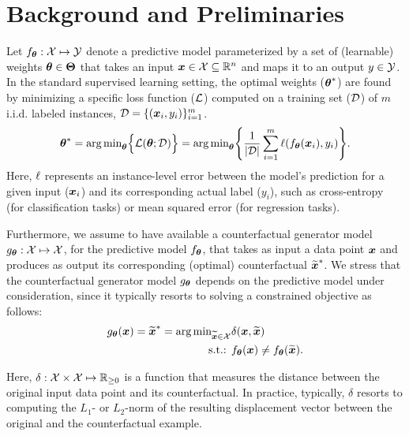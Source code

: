 \section{Background and Preliminaries}
\label{sec:background}
Let $f_{\boldsymbol{\theta}}: \mathcal{X} \mapsto \mathcal{Y}$ denote a predictive model parameterized by a set of (learnable) weights $\boldsymbol{\theta} \in \boldsymbol{\Theta}$ that takes an input $\boldsymbol{x}\in \mathcal{X}\subseteq \mathbb{R}^n$ and maps it to an output $y\in \mathcal{Y}$. 
In the standard supervised learning setting, the optimal weights ($\boldsymbol{\theta}^*$) are found by minimizing a specific loss function ($\mathcal{L}$) computed on a training set ($\mathcal{D}$) of $m$ i.i.d. labeled instances, $\mathcal{D}=\{(\boldsymbol{x}_i, y_i)\}_{i=1}^m$.
\begin{equation}
\label{eq:train}
\boldsymbol{\theta}^* = \text{arg\,min}_{\boldsymbol{\theta}}\Big\{\mathcal{L}(\boldsymbol{\theta};\mathcal{D})\Big\} = \text{arg\,min}_{\boldsymbol{\theta}}\Bigg\{\frac{1}{|\mathcal{D}|} \sum_{i=1}^m\ell(f_{\boldsymbol{\theta}}(\boldsymbol{x}_i),y_i)\Bigg\}.
\end{equation}
Here, $\ell$ represents an instance-level error between the model's prediction for a given input ($\boldsymbol{x}_i$) and its corresponding actual label ($y_i$), such as cross-entropy (for classification tasks) or mean squared error (for regression tasks).

Furthermore, we assume to have available a counterfactual generator model $g_{\boldsymbol{\theta}}: \mathcal{X} \mapsto \mathcal{X}$, for the predictive model $f_{\boldsymbol{\theta}}$, that takes as input a data point $\boldsymbol{x}$ and produces as output its corresponding (optimal) counterfactual $\widetilde{\boldsymbol{x}}^*$. We stress that the counterfactual generator model $g_{\boldsymbol{\theta}}$ depends on the predictive model under consideration, since it typically resorts to solving a constrained objective as follows:
\begin{equation}
\label{eq:cf-train}
\begin{aligned}
g_{\boldsymbol{\theta}}(\boldsymbol{x}) = \widetilde{\boldsymbol{x}}^* = \text{arg\,min}_{\widetilde{\boldsymbol{x}}\in \mathcal{X}}  &\delta(\boldsymbol{x}, \widetilde{\boldsymbol{x}})\\
\text{ s.t.: } &f_{\boldsymbol{\theta}}(\boldsymbol{x}) \neq f_{\boldsymbol{\theta}}(\widetilde{\boldsymbol{x}}).
\end{aligned}
\end{equation}

Here, $\delta:\mathcal{X}\times \mathcal{X} \mapsto \mathbb{R}_{\geq 0}$ is a function that measures the distance between the original input data point and its counterfactual. In practice, typically, $\delta$ resorts to computing the $L_1$- or $L_2$-norm of the resulting displacement vector between the original and the counterfactual example.

